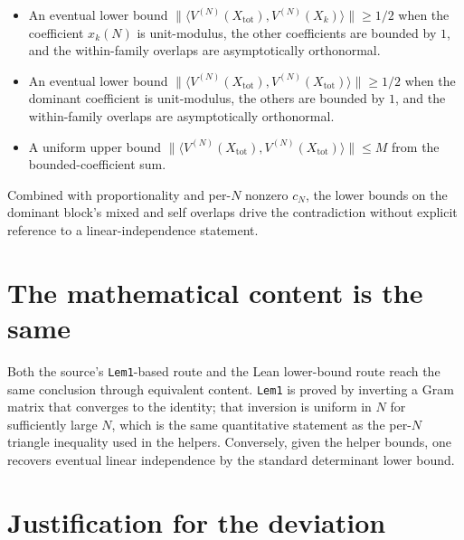 \documentclass[11pt]{article}
\begin{document}
\begin{itemize}
    \item An eventual lower bound
    $\|\langle V^{(N)}(X_{\mathrm{tot}}), V^{(N)}(X_k)\rangle\|\ge 1/2$
    when the coefficient $x_k(N)$ is unit-modulus, the
    other coefficients are bounded by $1$, and the within-family
    overlaps are asymptotically orthonormal.

    \item An eventual lower bound
    $\|\langle V^{(N)}(X_{\mathrm{tot}}), V^{(N)}(X_{\mathrm{tot}})\rangle\|
    \ge 1/2$ when the dominant coefficient is unit-modulus, the others are
    bounded by $1$, and the within-family overlaps are asymptotically
    orthonormal.

    \item A uniform upper bound
    $\|\langle V^{(N)}(X_{\mathrm{tot}}), V^{(N)}(X_{\mathrm{tot}})\rangle\|
    \le M$ from the bounded-coefficient sum.
\end{itemize}

Combined with proportionality and per-$N$ nonzero $c_N$, the lower bounds
on the dominant block's mixed and self overlaps drive the contradiction
without explicit reference to a linear-independence statement.

\section{The mathematical content is the same}

Both the source's \texttt{Lem1}-based route and the Lean lower-bound route
reach the same conclusion through equivalent content.  \texttt{Lem1} is
proved by inverting a Gram matrix that converges to the identity; that
inversion is uniform in $N$ for sufficiently large $N$, which is the same
quantitative statement as the per-$N$ triangle inequality used in the
helpers.  Conversely, given the helper bounds, one recovers eventual
linear independence by the standard determinant lower bound.

\section{Justification for the deviation}
\end{document}
